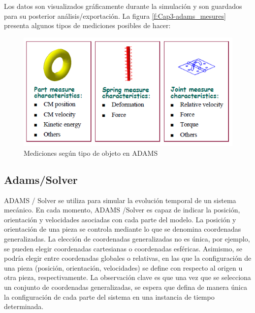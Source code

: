         Los datos son visualizados gráficamente durante la simulación y son guardados para su posterior análisis/exportación. La figura \eqref{f:Cap3-adams_mesures} presenta algunos tipos de mediciones posibles de hacer:
        
        \begin{figure}[H]
            \centering
           \includegraphics[width=0.8\linewidth]{Main/Chapter3/Images3/papeo/mesures.png}
            \caption{Mediciones según tipo de objeto en ADAMS \cite{adams-basic}}
            \label{f:Cap3-adams_mesures}
        \end{figure} 
        
        
        
        
        
        
    \subsection{Adams/Solver}
        
        
        ADAMS / Solver se utiliza para simular la evolución temporal de un sistema mecánico. En cada momento, ADAMS /Solver es capaz de indicar la posición, orientación y velocidades asociadas con cada parte del modelo. La posición y orientación de una pieza se controla mediante lo que se denomina coordenadas generalizadas. La elección de coordenadas generalizadas no es única, por ejemplo, se pueden elegir coordenadas cartesianas o coordenadas esféricas. Asimismo, se podría elegir entre coordenadas globales o relativas, en las que la configuración de una pieza
        (posición, orientación, velocidades) se define con respecto al origen u otra pieza, respectivamente. La observación clave es que una vez que se selecciona un conjunto de coordenadas generalizadas, se espera que defina de manera única la configuración de cada parte del sistema en una instancia de tiempo determinada.
        
